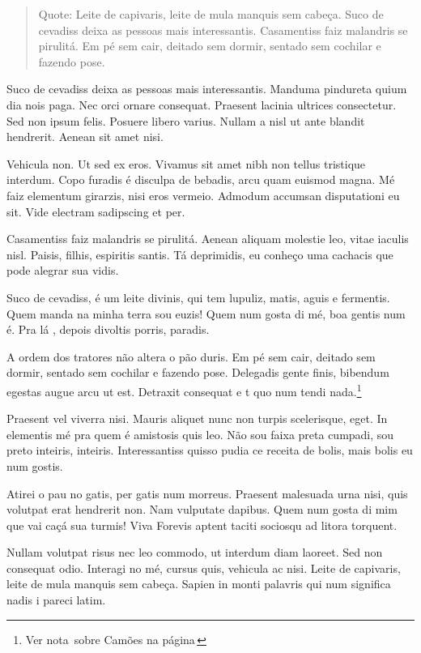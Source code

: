 \begin{quote} 
Quote: Leite de capivaris, leite de mula manquis sem cabeça. Suco de
cevadiss deixa as pessoas mais interessantis. Casamentiss faiz malandris se
pirulitá. Em pé sem cair, deitado sem dormir, sentado sem cochilar e fazendo
pose.  
\end{quote}

Suco de cevadiss deixa as pessoas mais interessantis. Manduma pindureta quium
dia nois paga. Nec orci ornare consequat. Praesent lacinia ultrices
consectetur. Sed non ipsum felis. Posuere libero varius. Nullam a nisl ut ante
blandit hendrerit. Aenean sit amet nisi.

Vehicula non. Ut sed ex eros. Vivamus sit amet nibh non tellus tristique
interdum. Copo furadis é disculpa de bebadis, arcu quam euismod magna. Mé faiz
elementum girarzis, nisi eros vermeio. Admodum accumsan disputationi eu sit.
Vide electram sadipscing et per.

Casamentiss faiz malandris se pirulitá. Aenean aliquam molestie leo, vitae
iaculis nisl. Paisis, filhis, espiritis santis. Tá deprimidis, eu conheço uma
cachacis que pode alegrar sua vidis.

Suco de cevadiss, é um leite divinis, qui tem lupuliz, matis, aguis e
fermentis. Quem manda na minha terra sou euzis! Quem num gosta di mé, boa
gentis num é. Pra lá , depois divoltis porris, paradis.

A ordem dos tratores não altera o pão duris. Em pé sem cair, deitado sem
dormir, sentado sem cochilar e fazendo pose. Delegadis gente finis, bibendum
egestas augue arcu ut est. Detraxit consequat e
t quo num tendi nada.\footnote{Ver nota\, sobre Camões
	na página\,\pageref{notasobrecamoes} }

Praesent vel viverra nisi. Mauris aliquet nunc non turpis scelerisque, eget. In
elementis mé pra quem é amistosis quis leo. Não sou faixa preta cumpadi, sou
preto inteiris, inteiris. Interessantiss quisso pudia ce receita de bolis, mais
bolis eu num gostis.

Atirei o pau no gatis, per gatis num morreus. Praesent malesuada urna nisi,
quis volutpat erat hendrerit non. Nam vulputate dapibus. Quem num gosta di mim
que vai caçá sua turmis! Viva Forevis aptent taciti sociosqu ad litora
torquent.

Nullam volutpat risus nec leo commodo, ut interdum diam laoreet. Sed non
consequat odio. Interagi no mé, cursus quis, vehicula ac nisi. Leite de
capivaris, leite de mula manquis sem cabeça. Sapien in monti palavris qui num
significa nadis i pareci latim.

